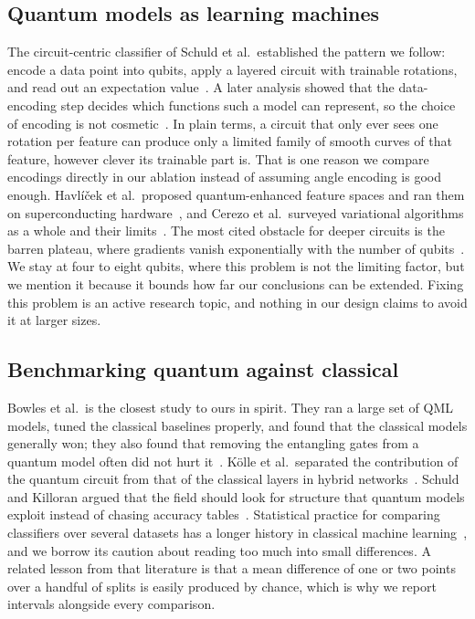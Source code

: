 \documentclass[conference]{IEEEtran}
\begin{document}
\subsection{Quantum models as learning machines}
The circuit-centric classifier of Schuld et al.\ established the pattern we follow: encode a data point into qubits, apply a layered circuit with trainable rotations, and read out an expectation value~\cite{schuld2020circuit}. A later analysis showed that the data-encoding step decides which functions such a model can represent, so the choice of encoding is not cosmetic~\cite{schuld2021encoding}. In plain terms, a circuit that only ever sees one rotation per feature can produce only a limited family of smooth curves of that feature, however clever its trainable part is. That is one reason we compare encodings directly in our ablation instead of assuming angle encoding is good enough. Havl\'i\v{c}ek et al.\ proposed quantum-enhanced feature spaces and ran them on superconducting hardware~\cite{havlicek2019supervised}, and Cerezo et al.\ surveyed variational algorithms as a whole and their limits~\cite{cerezo2021variational}. The most cited obstacle for deeper circuits is the barren plateau, where gradients vanish exponentially with the number of qubits~\cite{mcclean2018barren}. We stay at four to eight qubits, where this problem is not the limiting factor, but we mention it because it bounds how far our conclusions can be extended. Fixing this problem is an active research topic, and nothing in our design claims to avoid it at larger sizes.

\subsection{Benchmarking quantum against classical}
Bowles et al.\ is the closest study to ours in spirit. They ran a large set of QML models, tuned the classical baselines properly, and found that the classical models generally won; they also found that removing the entangling gates from a quantum model often did not hurt it~\cite{bowles2024better}. K\"olle et al.\ separated the contribution of the quantum circuit from that of the classical layers in hybrid networks~\cite{kolle2023disentangling}. Schuld and Killoran argued that the field should look for structure that quantum models exploit instead of chasing accuracy tables~\cite{schuld2022advantage}. Statistical practice for comparing classifiers over several datasets has a longer history in classical machine learning~\cite{demsar2006statistical}, and we borrow its caution about reading too much into small differences. A related lesson from that literature is that a mean difference of one or two points over a handful of splits is easily produced by chance, which is why we report intervals alongside every comparison.
\end{document}
